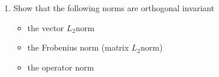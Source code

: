 \documentclass[letterpaper,10pt,english]{jupyterBook}
\begin{document}
\begin{enumerate}
\begin{sphinxuseclass}{toggle}
\sphinxAtStartPar
{} Let \(A,B\in\mathbb{R}^{n\times n}\) be orthogonal matrices. Orthogonal matrices satisfy the property \(AA^\top =A^\top A=I\) and \(BB^\top =B^\top B=I\). Thus, we have
\begin{align*}
    \lVert A-B\rVert^2 &= \lVert A\rVert^2 -2\tr(AB^\top) + \lVert B\rVert^2 &\text{(binomial formula for matrix norms)}\\
    &= \tr(A^\top A) -2\tr(AB^\top) +\tr(B^\top B) &\text{(definition of elementwise matrix $L_2$-norm)}\\
    &= \tr(I) -2\tr(AB^\top) +\tr(I) &\text{(orthogonality of $A$ and $B$)}\\
    &= -2\tr(AB^\top) +2n, 
\end{align*}
\sphinxAtStartPar
because \(\tr(I) = \underbrace{1 +\ldots +1}_{n \text{ times}} =n\). This concludes the proof.

\end{sphinxuseclass}
\item {} 
\sphinxAtStartPar
Show that the following norms are orthogonal invariant
\begin{itemize}
\item {} 
\sphinxAtStartPar
the vector \(L_2\)\sphinxhyphen{}norm

\item {} 
\sphinxAtStartPar
the Frobenius norm (matrix \(L_2\)\sphinxhyphen{}norm)

\item {} 
\sphinxAtStartPar
the operator norm

\end{itemize}


\end{enumerate}
\end{document}
